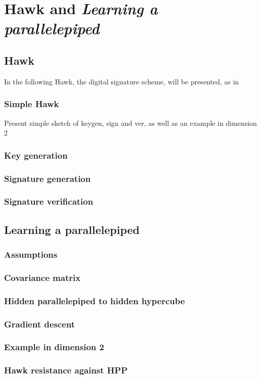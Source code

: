 \chapter{Hawk and \textit{Learning a parallelepiped}}

\section{Hawk}
In the following Hawk, the digital signature scheme, will be presented, as in \cite{hawkspec}
\subsection{Simple Hawk}
Present simple sketch of keygen, sign and ver, as well as an example in dimension 2
\subsection{Key generation}
\subsection{Signature generation}
\subsection{Signature verification}

\section{Learning a parallelepiped}
\subsection{Assumptions}
\subsection{Covariance matrix}
\subsection{Hidden parallelepiped to hidden hypercube}
\subsection{Gradient descent}
\subsection{Example in dimension 2}
\subsection{Hawk resistance against HPP}
